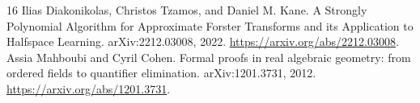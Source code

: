 \documentclass[11pt]{article}
\newcommand{\1}{\mathbf 1}
\begin{document}
\begin{thebibliography}{16}
 Ilias Diakonikolas, Christos Tzamos, and Daniel M. Kane. A Strongly Polynomial Algorithm for Approximate Forster Transforms and its Application to Halfspace Learning. arXiv:2212.03008, 2022. \url{https://arxiv.org/abs/2212.03008}.
 Assia Mahboubi and Cyril Cohen. Formal proofs in real algebraic geometry: from ordered fields to quantifier elimination. arXiv:1201.3731, 2012. \url{https://arxiv.org/abs/1201.3731}.
\end{thebibliography}
\end{document}
